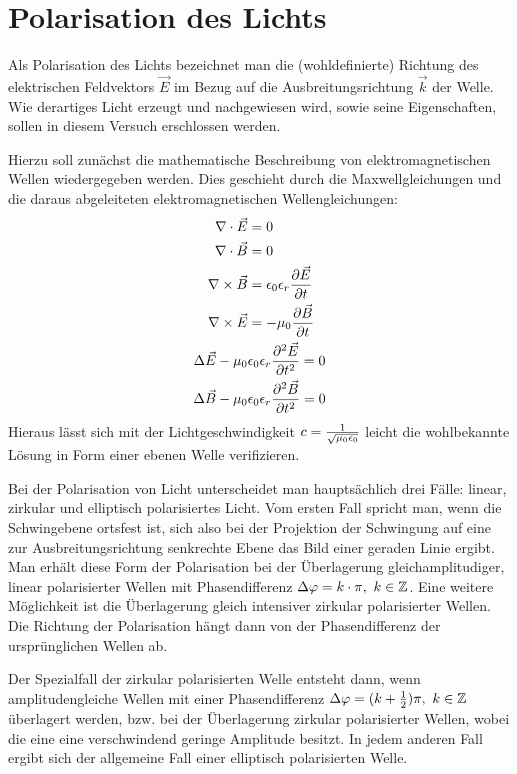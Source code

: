 \chapter{Polarisation des Lichts}
Als Polarisation des Lichts bezeichnet man die (wohldefinierte) Richtung des elektrischen Feldvektors $\vec{E}$ im Bezug auf die Ausbreitungsrichtung $\vec{k}$ der Welle. Wie derartiges Licht erzeugt und nachgewiesen wird, sowie seine Eigenschaften, sollen in diesem Versuch erschlossen werden. 

Hierzu soll zunächst die mathematische Beschreibung von elektromagnetischen Wellen wiedergegeben werden. Dies geschieht durch die Maxwellgleichungen und die daraus abgeleiteten elektromagnetischen Wellengleichungen:
\begin{align}
	\label{eq:4}\nabla\cdot\vec{E}&=0\\
	\label{eq:6}\nabla\cdot\vec{B}&=0\\
	\nabla\times\vec{B}&=\epsilon_0\epsilon_r\frac{\partial\vec{E}}{\partial t}\\
	\label{eq:5}\nabla\times\vec{E}&=-\mu_0\frac{\partial\vec{B}}{\partial t}\\
	\Delta\vec{E}-\mu_0&\epsilon_0\epsilon_r\frac{\partial^2\vec{E}}{\partial t^2}=0\\
	\Delta\vec{B}-\mu_0&\epsilon_0\epsilon_r\frac{\partial^2\vec{B}}{\partial t^2}=0
\end{align}
Hieraus lässt sich mit der Lichtgeschwindigkeit $c=\frac{1}{\sqrt{\mu_0\epsilon_0}}$ leicht die wohlbekannte Lösung in Form einer ebenen Welle verifizieren.

Bei der Polarisation von Licht unterscheidet man hauptsächlich drei Fälle: linear, zirkular und elliptisch polarisiertes Licht. Vom ersten Fall spricht man, wenn die Schwingebene ortsfest ist, sich also bei der Projektion der Schwingung auf eine zur Ausbreitungsrichtung senkrechte Ebene das Bild einer geraden Linie ergibt. Man erhält diese Form der Polarisation bei der Überlagerung gleichamplitudiger, linear polarisierter Wellen mit Phasendifferenz $\Delta\varphi=k\cdot\pi,~ k\in\mathbb{Z}$. Eine weitere Möglichkeit ist die Überlagerung gleich intensiver zirkular polarisierter Wellen. Die Richtung der Polarisation hängt dann von der Phasendifferenz der ursprünglichen Wellen ab.

Der Spezialfall der zirkular polarisierten Welle entsteht dann, wenn amplitudengleiche Wellen mit einer Phasendifferenz $\Delta\varphi=(k+\frac{1}{2})\pi,~k\in\mathbb{Z}$ überlagert werden, bzw. bei der Überlagerung zirkular polarisierter Wellen, wobei die eine eine verschwindend geringe Amplitude besitzt. In jedem anderen Fall ergibt sich der allgemeine Fall einer elliptisch polarisierten Welle.

